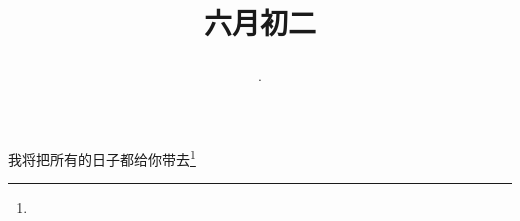 \title{\date[d=7,m=7,y=2024][year:cn-y,年,month:cn,day:cn,日,·,weekday]·六月初二 }
我将把所有的日子都给你带去\footnote{ }

